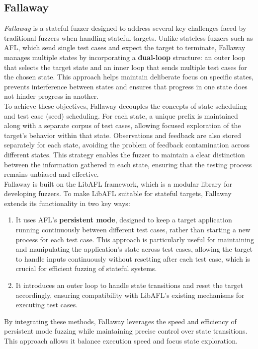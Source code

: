 \subsection{Fallaway}
\textit{Fallaway} \cite{Fallaway} is a stateful fuzzer designed to address several key challenges faced by traditional fuzzers when handling stateful targets. Unlike stateless fuzzers such as AFL, which send single test cases and expect the target to terminate, Fallaway manages multiple states by incorporating a \textbf{dual-loop} structure: an outer loop that selects the target state and an inner loop that sends multiple test cases for the chosen state. This approach helps maintain deliberate focus on specific states, prevents interference between states and ensures that progress in one state does not hinder progress in another.
\\To achieve these objectives, Fallaway decouples the concepts of state scheduling and test case (seed) scheduling. For each state, a unique prefix is maintained along with a separate corpus of test cases, allowing focused exploration of the target's behavior within that state. Observations and feedback are also stored separately for each state, avoiding the problem of feedback contamination across different states. This strategy enables the fuzzer to maintain a clear distinction between the information gathered in each state, ensuring that the testing process remains unbiased and effective.
\\Fallaway is built on the LibAFL framework, which is a modular library for developing fuzzers. To make LibAFL suitable for stateful targets, Fallaway extends its functionality in two key ways:
\begin{enumerate}
    \item It uses AFL's \textbf{persistent mode}, designed to keep a target application running continuously between different test cases, rather than starting a new process for each test case. This approach is particularly useful for maintaining and manipulating the application's state across test cases, allowing the target to handle inputs continuously without resetting after each test case, which is crucial for efficient fuzzing of stateful systems.
    \item It introduces an outer loop to handle state transitions and reset the target accordingly, ensuring compatibility with LibAFL's existing mechanisms for executing test cases.
\end{enumerate}  
By integrating these methods, Fallaway leverages the speed and efficiency of persistent mode fuzzing while maintaining precise control over state transitions. This approach allows it balance execution speed and focus state exploration.
